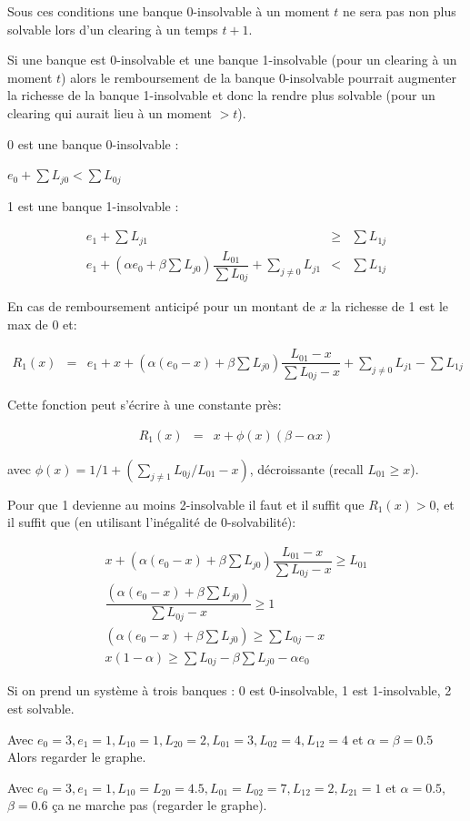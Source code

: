 \documentclass{article}
\def\AR#1{
\[
\begin{array}{llllllll}
#1
\end{array}
\]
}
\begin{document}
Sous ces conditions une banque 0-insolvable à un moment $t$ ne sera pas non plus solvable lors d'un clearing à un temps $t+1$.

Si une banque est 0-insolvable et une banque 1-insolvable (pour un clearing à un moment $t$) alors le remboursement de la banque 0-insolvable pourrait augmenter la richesse de la banque 1-insolvable et donc la rendre plus solvable (pour un clearing qui aurait lieu à un moment $>t$). 

0 est une banque 0-insolvable :

$e_0 + \sum L_{j0} < \sum L_{0j}$

1 est une banque 1-insolvable : 
\AR{
e_1 + \sum L_{j1} &\geq& \sum L_{1j}
\\
e_1 + (\alpha e_0 + \beta \sum L_{j0}) \dfrac{L_{01}}{\sum L_{0j}} + \sum_{j\neq0} L_{j1} 
&<& \sum L_{1j}
}

En cas de remboursement anticipé pour un montant de $x$ la richesse de 1 est le max de 0 et:
\AR{
R_1(x) &=&
e_1 + x + (\alpha (e_0 - x) + \beta \sum L_{j0}) \dfrac{L_{01}-x}{\sum L_{0j}-x} + \sum_{j \neq 0} L_{j1} - \sum L_{1j}
}
Cette fonction peut s'écrire à une constante près:
\AR{
R_1(x) &=&
x + \phi(x)(\beta- \alpha x )
}
avec $\phi(x) = 1/ 1 + (\sum_{j\neq 1}L_{0j}/L_{01}-x)$,
décroissante (recall $L_{01}\geq x$).

Pour que 1 devienne au moins 2-insolvable il faut et il suffit que $R_1(x)>0$, et il suffit que (en utilisant l'inégalité de 0-solvabilité):
\AR{
x + 
(\alpha (e_0 - x) + \beta \sum L_{j0})
 \dfrac
{L_{01}-x}
{\sum L_{0j}-x} 
\geq 
L_{01}
\\
\dfrac
{(\alpha (e_0 - x) + \beta \sum L_{j0})}
{\sum L_{0j}-x}
\geq
1
\\
(\alpha (e_0 - x) + \beta \sum L_{j0})
\geq
\sum L_{0j}-x
\\
x(1-\alpha)
\geq
\sum L_{0j}
- \beta \sum L_{j0}
- \alpha e_0 
}


Si on prend un système à trois banques :
0 est 0-insolvable, 1 est 1-insolvable, 2 est solvable.

Avec 
$e_0 = 3, e_1 = 1, L_{10}= 1, L_{20}=2, L_{01}=3, L_{02}=4, L_{12} = 4$ et 
$\alpha = \beta =0.5$
Alors regarder le graphe.

Avec $e_0 = 3, e_1 = 1, L_{10}=  L_{20}=4.5, L_{01}=L_{02}=7, L_{12} = 2, L_{21}=1$  et 
$\alpha = 0.5$, 
$\beta =0.6$ ça ne marche pas (regarder le graphe).
\end{document}
